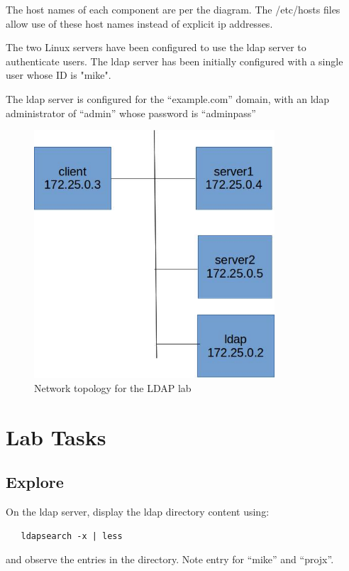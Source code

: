 The host names of each component are per the diagram.  The /etc/hosts files
allow use of these host names instead of explicit ip addresses.

The two Linux servers have been configured to use the ldap server to 
authenticate users.  The ldap server has been initially configured
with a single user whose ID is "mike".

The ldap server is configured for the ``example.com'' domain, with
an ldap administrator of ``admin'' whose password is ``adminpass''

\begin{figure}[htb]
\begin{center}
\includegraphics [width=0.8\textwidth,natwidth=621,natheight=403]{ldap.jpg}
\end{center}
\caption{Network topology for the LDAP lab}
\label{fig:topology}
\end{figure}

\section{Lab Tasks}
\subsection{Explore}
On the ldap server, display the ldap directory content using:
\begin{verbatim}
   ldapsearch -x | less
\end{verbatim}
\noindent and observe the entries in the directory. Note entry for ``mike'' and
``projx''.


